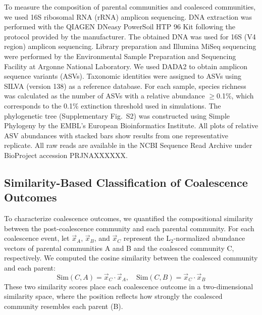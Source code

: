 To measure the composition of parental communities and coalesced communities, we used 16S ribosomal RNA (rRNA) amplicon sequencing. DNA extraction was performed with the QIAGEN DNeasy PowerSoil HTP 96 Kit following the protocol provided by the manufacturer. The obtained DNA was used for 16S (V4 region) amplicon sequencing. Library preparation and Illumina MiSeq sequencing were performed by the Environmental Sample Preparation and Sequencing Facility at Argonne National Laboratory. We used DADA2\citep{Callahan2016} to obtain amplicon sequence variants (ASVs). Taxonomic identities were assigned to ASVs using SILVA (version 138)\citep{Quast2013} as a reference database. For each sample, species richness was calculated as the number of ASVs with a relative abundance $\geq$0.1\%, which corresponds to the 0.1\% extinction threshold used in simulations. The phylogenetic tree (Supplementary Fig.~S2) was constructed using Simple Phylogeny\citep{Madeira2022} by the EMBL's European Bioinformatics Institute. All plots of relative ASV abundances with stacked bars show results from one representative replicate. All raw reads are available in the NCBI Sequence Read Archive under BioProject accession PRJNAXXXXXX.


\subsection*{Similarity-Based Classification of Coalescence Outcomes}
\label{sec:methods:classification}

To characterize coalescence outcomes, we quantified the compositional similarity between the post-coalescence community and each parental community. For each coalescence event, let $\vec{x}_A$, $\vec{x}_B$, and $\vec{x}_C$ represent the L$_2$-normalized abundance vectors of parental communities A and B and the coalesced community C, respectively. We computed the cosine similarity between the coalesced community and each parent:
\begin{equation}
\text{Sim}(C, A) = \vec{x}_C \cdot \vec{x}_A, \quad \text{Sim}(C, B) = \vec{x}_C \cdot \vec{x}_B
\label{eq:similarity_methods}
\end{equation}
These two similarity scores place each coalescence outcome in a two-dimensional similarity space, where the position reflects how strongly the coalesced community resembles each parent (B).

